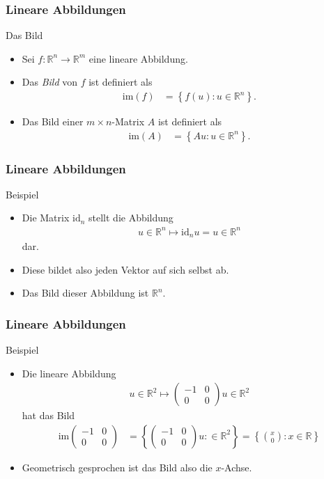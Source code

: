 \documentclass{beamer}
\renewcommand{\emph}[1]{{\textcolor{solarizedRed}{\itshape #1}}}
\newcommand\RR{\mathbb R}
\newcommand{\id}{\mathrm{id}}
\newcommand\cbc[1]{\left\{{#1}\right\}}
\newcommand{\im}{\mathrm{im}}
\newcommand{\mytitle}{Lineare Abbildungen}
\begin{document}
\begin{frame}\frametitle{\mytitle}
	\begin{block}{Das Bild}
		\begin{itemize}
			\item Sei $f:\RR^n\to\RR^m$ eine lineare Abbildung.
			\item Das \emph{Bild} von $f$ ist definiert als
				\begin{align*}
					\im(f)&=\cbc{f(u):u\in\RR^n}.
				\end{align*}
			\item Das Bild einer $m\times n$-Matrix $A$ ist definiert als
				\begin{align*}
					\im(A)&=\cbc{Au:u\in\RR^n}.
				\end{align*}
		\end{itemize}
	\end{block}
\end{frame}

\begin{frame}\frametitle{\mytitle}
	\begin{block}{Beispiel}
		\begin{itemize}
			\item Die Matrix $\id_n$ stellt die Abbildung
				\begin{align*}
					u\in\RR^n\mapsto \id_n u=u\in\RR^n
				\end{align*}
				dar.
			\item Diese bildet also jeden Vektor auf sich selbst ab.
			\item Das Bild dieser Abbildung ist $\RR^n$.
		\end{itemize}
	\end{block}
\end{frame}

\begin{frame}\frametitle{\mytitle}
	\begin{block}{Beispiel}
		\begin{itemize}
			\item Die lineare Abbildung 
				\begin{align*}
					u\in\RR^2\mapsto\begin{pmatrix}-1&0\\0&0\end{pmatrix}u\in\RR^2
				\end{align*}
				hat das Bild
				\begin{align*}
					\im\begin{pmatrix}-1&0\\0&0\end{pmatrix}&=\cbc{\begin{pmatrix}-1&0\\0&0\end{pmatrix}u:\in\RR^2}=\cbc{\binom{x}0:x\in\RR}
				\end{align*}
			\item Geometrisch gesprochen ist das Bild also die $x$-Achse.
		\end{itemize}
	\end{block}
\end{frame}
\end{document}
